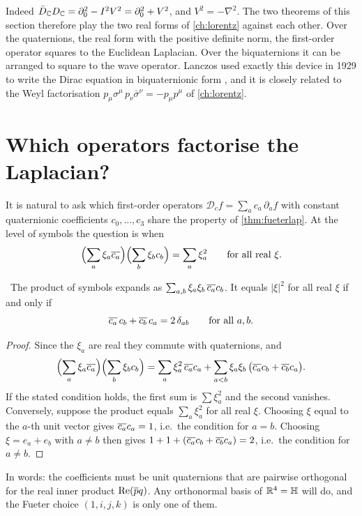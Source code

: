 Indeed $\bar D_{\mathbb{C}}D_{\mathbb{C}}=\partial_0^2-I^2V^2=\partial_0^2+V^2$, and $V^2=-\nabla^2$. The two theorems of this section therefore play the two real forms of \cref{ch:lorentz} against each other. Over the quaternions, the real form with the positive definite norm, the first-order operator squares to the Euclidean Laplacian. Over the biquaternions it can be arranged to square to the wave operator. Lanczos used exactly this device in 1929 to write the Dirac equation in biquaternionic form \cite{Lanczos1929}, and it is closely related to the Weyl factorisation $p_\mu\sigma^\mu\,p_\nu\bar\sigma^\nu=-p_\mu p^\mu$ of \cref{ch:lorentz}.

\section{Which operators factorise the Laplacian?}

It is natural to ask which first-order operators $\mathcal D_cf=\sum_ac_a\,\partial_af$ with constant quaternionic coefficients $c_0,\dots,c_3$ share the property of \cref{thm:fueterlap}. At the level of symbols the question is when
\[
\Bigl(\sum_a\xi_a\overline{c_a}\Bigr)\Bigl(\sum_b\xi_bc_b\Bigr)=\sum_a\xi_a^2\qquad\text{for all real }\xi .
\]

\begin{theorem}\label{thm:factcrit}\ver\
The product of symbols expands as $\sum_{a,b}\xi_a\xi_b\,\overline{c_a}c_b$. It equals $|\xi|^2$ for all real $\xi$ if and only if
\[
\overline{c_a}\,c_b+\overline{c_b}\,c_a=2\,\delta_{ab}\qquad\text{for all }a,b .
\]
\end{theorem}
\begin{proof}
Since the $\xi_a$ are real they commute with quaternions, and
\[
\Bigl(\sum_a\xi_a\overline{c_a}\Bigr)\Bigl(\sum_b\xi_bc_b\Bigr)=\sum_a\xi_a^2\,\overline{c_a}c_a+\sum_{a<b}\xi_a\xi_b\,\bigl(\overline{c_a}c_b+\overline{c_b}c_a\bigr).
\]
If the stated condition holds, the first sum is $\sum\xi_a^2$ and the second vanishes. Conversely, suppose the product equals $\sum_a\xi_a^2$ for all real $\xi$. Choosing $\xi$ equal to the $a$-th unit vector gives $\overline{c_a}c_a=1$, i.e.\ the condition for $a=b$. Choosing $\xi=e_a+e_b$ with $a\ne b$ then gives $1+1+(\overline{c_a}c_b+\overline{c_b}c_a)=2$, i.e.\ the condition for $a\ne b$.
\end{proof}


In words: the coefficients must be unit quaternions that are pairwise orthogonal for the real inner product $\operatorname{Re}(\overline{p}q)$. Any orthonormal basis of $\mathbb{R}^4=\mathbb{H}$ will do, and the Fueter choice $(1,i,j,k)$ is only one of them.

